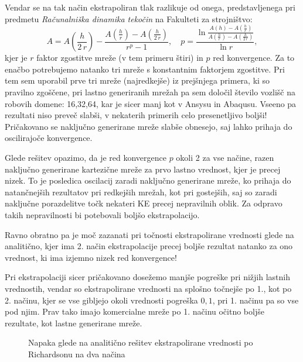 Vendar se na tak način ekstrapoliran tlak razlikuje od onega, predstavljenega pri predmetu \textit{Računalniška dinamika tekočin} na Fakulteti za strojništvo:
\begin{equation}\label{eq:richardson_2}
    A = A\left(\frac{h}{2\,r}\right) - \frac{A\left(\frac{h}{r}\right) - A\left(\frac{h}{2\,r}\right)}{r^p-1}, \quad p = \frac {\ln{\frac {A(h) - A\left(\frac{h}{r}\right)} {A\left(\frac{h}{r}\right)- A\left(\frac{h}{2\,r}\right)}} } {\ln{r}},
\end{equation}
kjer je $r$ faktor zgostitve mreže (v tem primeru štiri) in $p$ red konvergence. Za to enačbo potrebujemo natanko tri mreže s konstantnim faktorjem zgostitve. Pri tem sem uporabil prve tri mreže (najredkejše) iz prejšnjega primera, ki so pravilno zgoščene, pri lastno generiranih mrežah pa sem določil število vozlišč na robovih domene: 16,32,64, kar je sicer manj kot v Ansysu in Abaqusu. Vseeno pa rezultati niso preveč slabši, v nekaterih primerih celo presenetljivo boljši! Pričakovano se naključno generirane mreže slabše obnesejo, saj lahko prihaja do oscilirajoče konvergence.

Glede rešitev opazimo, da je red konvergence $p$ okoli 2 za vse načine, razen naključno generirane kartezične mreže za prvo lastno vrednost, kjer je precej nizek. To je posledica oscilacij zaradi naključno generirane mreže, ko prihaja do natančnejših rezultatov pri redkejših mrežah, kot pri gostejših, saj so zaradi naključne porazdelitve točk nekateri KE precej nepravilnih oblik. Za odpravo takih nepravilnosti bi potebovali boljšo ekstrapolacijo.

Ravno obratno pa je moč zazanati pri točnosti ekstrapolirane vrednosti glede na analitično, kjer ima 2. način ekstrapolacije precej boljše rezultat natanko za ono vrednost, ki ima izjemno nizek red konvergence!

Pri ekstrapolaciji sicer pričakovano dosežemo manjše pogreške pri nižjih lastnih vrednostih, vendar so ekstrapolirane vrednosti na splošno točnejše po 1., kot po 2. načinu, kjer se vse gibljejo okoli vrednosti pogreška $0,1$, pri 1. načinu pa so vse pod njim. Prav tako imajo komercialne mreže po 1. načinu očitno boljše rezultate, kot lastne generirane mreže.
\newpage
{}

\begin{figure}[H]
    \centering
    \caption{Napaka glede na analitično rešitev ekstrapolirane vrednosti po Richardsonu na dva načina}
\end{figure}

